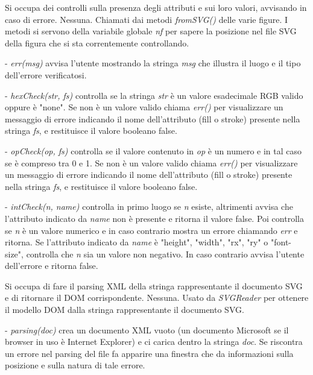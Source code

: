 Si occupa dei controlli sulla presenza degli attributi e sui loro valori, avvisando in caso di errore.
Nessuna.
Chiamati dai metodi \textit{fromSVG()} delle varie figure.
I metodi si servono della variabile globale \textit{nf} per sapere la posizione nel file SVG della figura che si sta correntemente controllando.
\begin{elencopuntato}[\subsubsecindent]
\item[-] \textit{err(msg)} avvisa l'utente mostrando la stringa \textit{msg} che illustra il luogo e il tipo dell'errore verificatosi.
\item[-] \textit{hexCheck(str, fs)} controlla se la stringa \textit{str} \`e un valore esadecimale RGB valido oppure \`e "none". Se non \`e un valore valido chiama \textit{err()} per visualizzare un messaggio di errore indicando il nome dell'attributo (fill o stroke) presente nella stringa \textit{fs}, e restituisce il valore booleano false.
\item[-] \textit{opCheck(op, fs)} controlla se il valore contenuto in \textit{op} \`e un numero e in tal caso se \`e compreso tra 0 e 1. Se non \`e un valore valido chiama \textit{err()} per visualizzare un messaggio di errore indicando il nome dell'attributo (fill o stroke) presente nella stringa \textit{fs}, e restituisce il valore booleano false.
\item[-] \textit{intCheck(n, name)} controlla in primo luogo se \textit{n} esiste, altrimenti avvisa che l'attributo indicato da \textit{name} non \`e presente e ritorna il valore false. Poi controlla se \textit{n} \`e un valore numerico e in caso contrario mostra un errore chiamando \textit{err} e ritorna. Se l'attributo indicato da \textit{name} \`e "height", "width", "rx", "ry" o "font-size", controlla che \textit{n} sia un valore non negativo. In caso contrario avvisa l'utente dell'errore e ritorna false.
\end{elencopuntato}

Si occupa di fare il parsing XML della stringa rappresentante il documento SVG e di ritornare il DOM corrispondente.
Nessuna.
Usato da \textit{SVGReader} per ottenere il modello DOM dalla stringa rappresentante il documento SVG.
\begin{elencopuntato}[\subsubsecindent]
\item[-] \textit{parsing(doc)} crea un documento XML vuoto (un documento Microsoft se il browser in uso \`e Internet Explorer) e ci carica dentro la stringa \textit{doc}. Se riscontra un errore nel parsing del file fa apparire una finestra che da informazioni sulla posizione e sulla natura di tale errore.
\end{elencopuntato}

